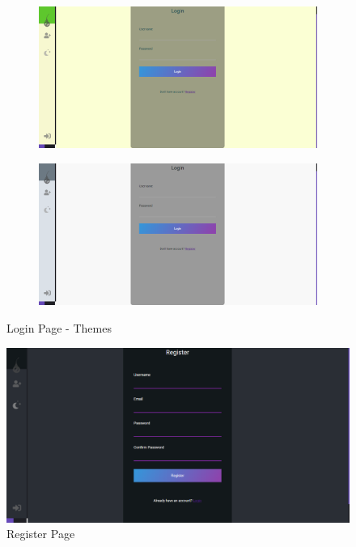 \begin{figure}
      \centering
      \begin{subfigure}[H]{0.4\textwidth}
          \centering
          \includegraphics[width=\textwidth]{assets/screen-login-gr.png}
      \end{subfigure}
      \hfill
      \begin{subfigure}[H]{0.4\textwidth}
          \centering
          \includegraphics[width=\textwidth]{assets/screen-login-grey.png}
      \end{subfigure}
      \caption{Login Page - Themes}
      
 \end{figure}





\begin{figure}[H]
      \centering
      \includegraphics[scale=0.45]{assets/screen-register-d.png}
      \caption{Register Page}
      \label{fig:register page}
\end{figure}

